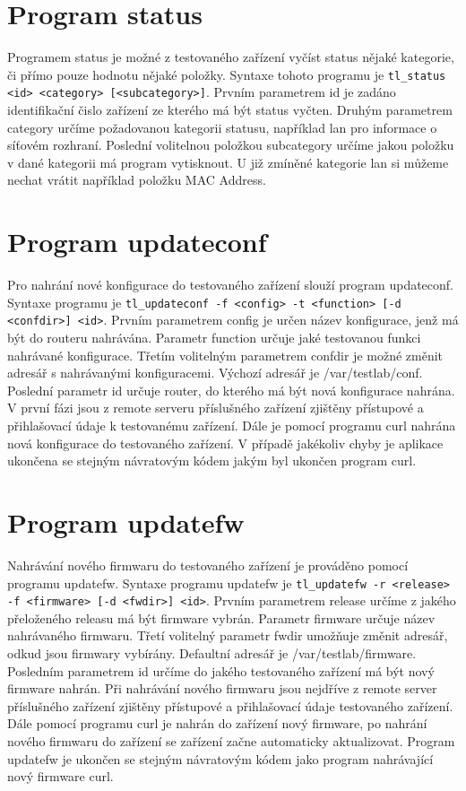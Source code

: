 \section{Program status}
Programem status je možné z testovaného zařízení vyčíst status nějaké kategorie, či přímo pouze hodnotu nějaké položky. Syntaxe tohoto programu je \texttt{tl\_status <id> <category> [<subcategory>]}. Prvním parametrem id je zadáno identifikační čislo zařízení ze kterého má být status vyčten. Druhým parametrem category určíme požadovanou kategorii statusu, například lan pro informace o síťovém rozhraní. Poslední volitelnou položkou subcategory určíme jakou položku v dané kategorii má program vytisknout. U již zmíněné kategorie lan si můžeme nechat vrátit například položku MAC Address.

\section{Program updateconf}
Pro nahrání nové konfigurace do testovaného zařízení slouží program updateconf. Syntaxe programu je \texttt{tl\_updateconf -f <config> -t <function> [-d <confdir>] <id>}. Prvním parametrem config je určen název konfigurace, jenž má být do routeru nahrávána. Parametr function určuje jaké testovanou funkci nahrávané konfigurace. Třetím volitelným parametrem confdir je možné změnit adresář s nahrávanými konfiguracemi. Výchozí adresář je /var/testlab/conf. Poslední parametr id určuje router, do kterého má být nová konfigurace nahrána. V první fázi jsou z remote serveru příslušného zařízení zjištěny přístupové a přihlašovací údaje k testovanému zařízení. Dále je pomocí programu curl nahrána nová konfigurace do testovaného zařízení. V případě jakékoliv chyby je aplikace ukončena se stejným návratovým kódem jakým byl ukončen program curl.

\section{Program updatefw}
Nahrávání nového firmwaru do testovaného zařízení je prováděno pomocí programu updatefw. Syntaxe programu updatefw je \texttt{tl\_updatefw -r <release> -f <firmware> [-d <fwdir>] <id>}. Prvním parametrem release určíme z jakého přeloženého releasu má být firmware vybrán. Parametr firmware určuje název nahrávaného firmwaru. Třetí volitelný parametr fwdir umožňuje změnit adresář, odkud jsou firmwary vybírány. Defaultní adresář je /var/testlab/firmware. Posledním parametrem id určíme do jakého testovaného zařízení má být nový firmware nahrán. Při nahrávání nového firmwaru jsou nejdříve z remote server příslušného zařízení zjištěny přístupové a přihlašovací údaje testovaného zařízení. Dále pomocí programu curl je nahrán do zařízení nový firmware, po nahrání nového firmwaru do zařízení se zařízení začne automaticky aktualizovat. Program updatefw je ukončen se stejným návratovým kódem jako program nahrávající nový firmware curl.

